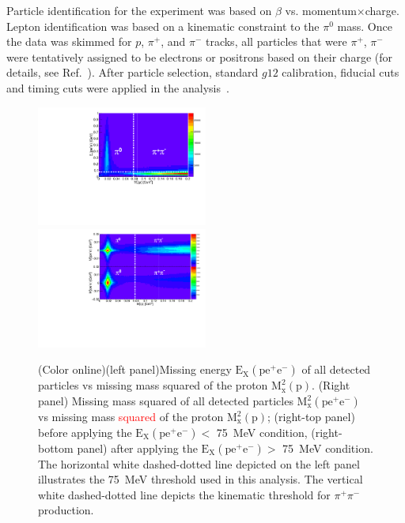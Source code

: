 \documentclass[aps,prc,twocolumn,floatfix,showpacs,preprintnumbers,amsmath,amssymb,superscriptaddress,linenumbers]{revtex4-1}
\begin{document}
Particle identification for the experiment was based on $\beta$ vs. momentum$\times$charge. 
Lepton identification was based on a kinematic constraint to the $\pi^0$ mass. 
Once the data was skimmed for $p$, $\pi^+$, and $\pi^-$ tracks, 
all particles that were $\pi^+$, $\pi^-$ were tentatively assigned 
to be electrons or positrons based on their charge (for details, 
see Ref.~\cite{Kunkel}). After particle selection, standard $g12$ 
calibration, fiducial cuts and timing cuts were applied 
in the analysis~\cite{g12}.
\begin{figure}[htb!]
        \centerline{
               \includegraphics[height=0.35\textwidth,width=0.5\textwidth]{ME_vs_mxpcompare.pdf}\hfill
               \includegraphics[height=0.35\textwidth,width=0.5\textwidth]{mm2_vs_mxp_compare.pdf}}

        \caption{(Color online)(left panel)Missing energy $\mathrm{E_X(pe^+e^-)}$ of all detected particles vs missing mass squared of the proton $  \mathrm{M_x^2(p)}$. (Right panel) Missing mass squared of all detected particles $\mathrm{M_x^2(pe^+e^-)}$ vs 
        	missing mass \textcolor{red}{squared} of the proton $\mathrm{M_x^2(p)}$; (right-top panel) before applying the
        	$\mathrm{E_X(pe^+e^-)} <$ 75~MeV condition, (right-bottom panel)
        	after applying the $\mathrm{E_X(pe^+e^-)} >$ 75~MeV condition.
        	The horizontal white dashed-dotted line depicted on the left
        	panel illustrates the 75~MeV threshold used in this analysis.
        	The vertical white dashed-dotted line depicts the kinematic
        	threshold for $\pi^+\pi^-$ production.}
        \label{fig:sys}
\end{figure}
\end{document}
